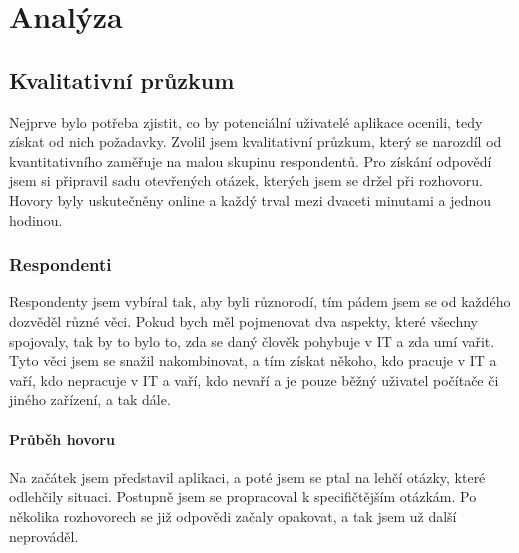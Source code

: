 
\chapter{Analýza}

\section{Kvalitativní průzkum}
Nejprve bylo potřeba zjistit, co by potenciální uživatelé aplikace ocenili, tedy získat od nich požadavky.
Zvolil jsem kvalitativní průzkum, který se narozdíl od kvantitativního zaměřuje na malou skupinu respondentů.
Pro získání odpovědí jsem si připravil sadu otevřených otázek, kterých jsem se držel při rozhovoru. Hovory byly
uskutečněny online a každý trval mezi dvaceti minutami a jednou hodinou.

\subsection{Respondenti}
Respondenty jsem vybíral tak, aby byli různorodí, tím pádem jsem se od každého dozvěděl různé věci. Pokud bych měl pojmenovat
dva aspekty, které všechny spojovaly, tak by to bylo to, zda se daný člověk pohybuje v IT a zda umí vařit. Tyto věci jsem se snažil
nakombinovat, a tím získat někoho, kdo pracuje v IT a vaří, kdo nepracuje v IT a vaří, kdo nevaří a je pouze běžný uživatel počítače či jiného
zařízení, a tak dále.

\subsubsection{Průběh hovoru}
Na začátek jsem představil aplikaci, a poté jsem se ptal na lehčí otázky, které odlehčily situaci. Postupně jsem se
propracoval k specifičtějším otázkám. Po několika rozhovorech se již odpovědi začaly opakovat, a tak jsem už další
neprováděl.

